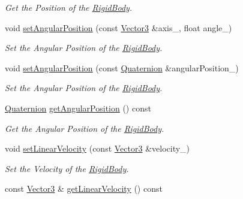 \begin{DoxyCompactItemize}
\begin{DoxyCompactList}\small\item\em Get the Position of the \hyperlink{class_i_dream_sky_1_1_physics3_1_1_rigid_body}{Rigid\+Body}. \end{DoxyCompactList}\item 
void \hyperlink{class_i_dream_sky_1_1_physics3_1_1_vehicle_aefeaacded7fcf298e36a2dfedddb7498}{set\+Angular\+Position} (const \hyperlink{class_i_dream_sky_1_1_vector3}{Vector3} \&axis\+\_\+, float angle\+\_\+)
\begin{DoxyCompactList}\small\item\em Set the Angular Position of the \hyperlink{class_i_dream_sky_1_1_physics3_1_1_rigid_body}{Rigid\+Body}. \end{DoxyCompactList}\item 
void \hyperlink{class_i_dream_sky_1_1_physics3_1_1_vehicle_af0922b6aa7579c1ce5b2cceaaae4b3b0}{set\+Angular\+Position} (const \hyperlink{class_i_dream_sky_1_1_quaternion}{Quaternion} \&angular\+Position\+\_\+)
\begin{DoxyCompactList}\small\item\em Set the Angular Position of the \hyperlink{class_i_dream_sky_1_1_physics3_1_1_rigid_body}{Rigid\+Body}. \end{DoxyCompactList}\item 
\hyperlink{class_i_dream_sky_1_1_quaternion}{Quaternion} \hyperlink{class_i_dream_sky_1_1_physics3_1_1_vehicle_a639e4f92374d53a97590adb38fca2447}{get\+Angular\+Position} () const 
\begin{DoxyCompactList}\small\item\em Get the Angular Position of the \hyperlink{class_i_dream_sky_1_1_physics3_1_1_rigid_body}{Rigid\+Body}. \end{DoxyCompactList}\item 
void \hyperlink{class_i_dream_sky_1_1_physics3_1_1_vehicle_a33cc09527d4c645ae80da210e8cf32ef}{set\+Linear\+Velocity} (const \hyperlink{class_i_dream_sky_1_1_vector3}{Vector3} \&velocity\+\_\+)
\begin{DoxyCompactList}\small\item\em Set the Velocity of the \hyperlink{class_i_dream_sky_1_1_physics3_1_1_rigid_body}{Rigid\+Body}. \end{DoxyCompactList}\item 
const \hyperlink{class_i_dream_sky_1_1_vector3}{Vector3} \& \hyperlink{class_i_dream_sky_1_1_physics3_1_1_vehicle_ac086a2129cee627d25feb8b94dfdc9fd}{get\+Linear\+Velocity} () const 

\end{DoxyCompactItemize}
